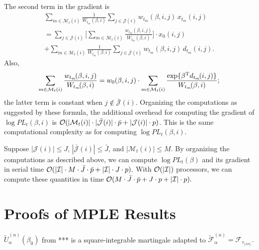 \documentclass[aoas,preprint]{imsart}
\begin{document}
The second term in the gradient is
\begin{multline*}
    \sum_{m \in \mathcal{M}_t(i)}
        \frac{1}{W_{t_m}\!(\beta,i)}
        \sum_{j \in \mathcal{J}(i)}
            w_{t_m}\!(\beta,i,j)
            \,
            x_{t_m}\!(i,j) \\
    =
    \sum_{j \in \mathcal{J}(i)}
    \bigg[
        \sum_{m \in \mathcal{M}_t(i)}
            \frac{w_{t_m}\!(\beta,i,j)}{W_{t_m}\!(\beta,i)}
    \bigg]
    \cdot
    x_0(i,j) \\
    +
    \sum_{m \in \mathcal{M}_t(i)}
        \frac{1}{W_{t_m}\!(\beta,i)}
        \sum_{j \in \mathcal{\bar J}(i)}
            w_{t_m}\!(\beta,i,j)
            \,
            d_{t_m}\!(i,j).
\end{multline*}
Also,
\[
    \sum_{m \in \mathcal{M}_t(i)}
        \frac{w_{t_m}\!(\beta,i,j)}{W_{t_m}\!(\beta,i)}
    =
        w_{0}(\beta,i,j)
        \cdot
        \sum_{m \in \mathcal{M}_t(i)}
            \frac{
                \exp\{\beta^{\mathrm{T}} d_{t_m}\!(i,j) \}
            }{
                W_{t_m}\!(\beta,i)
            };
\]
the latter term is constant when $j \notin \mathcal{\bar J}(i)$.
Organizing the computations as suggested by these formula,
the additional overhead for computing the gradient of
$\log \mathit{PL}_t(\beta,i)$ is
\(
    \mathcal{O}(
        |\mathcal{M}_t(i)| \cdot |\mathcal{\bar J}(i)| \cdot \bar p
        +
        |\mathcal{J}(i)| \cdot p
    )
\).
This is the same computational complexity as for computing
$\log \mathit{PL}_t(\beta,i)$.


Suppose $|\mathcal{J}(i)| \leq J$, $|\mathcal{\bar J}(i)| \leq \bar J$,
and $|\mathcal{M}_t(i)| \leq M$.  By organizing the computations as described
above, we can compute $\log \mathit{PL}_t(\beta)$ and its gradient in serial
time
\(
    \mathcal{O}(
        | \mathcal{I} |
        \cdot
        M
        \cdot
        \bar J
        \cdot
        \bar p
        +
        |\mathcal{I}| \cdot J \cdot p
    ).
\)
With $\mathcal{O}(|\mathcal{I}|)$ processors, we can compute these quantities in time
\(
    \mathcal{O}(
        M \cdot \bar J \cdot \bar p
        +
        J \cdot p
        +
        |\mathcal{I}| \cdot p
    ).
\)

\section{Proofs of MPLE Results}\label{S:MPLE-consistency-proofs}

\begin{lemma}\label{L:adapted-martingale}
$\tilde U_\alpha^{(n)}(\beta_0)$ from *** is a square-integrable martingale
adapted to
\(
    \mathcal{\tilde F}^{(n)}_\alpha
        =
        \mathcal{F}_{\tau_{\lfloor \alpha n \rfloor}}.
\)
\end{lemma}
\end{document}
